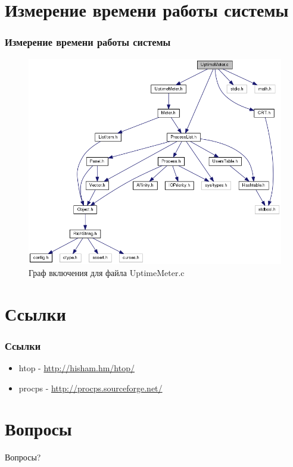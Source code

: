\documentclass{beamer}
\begin{document}
\section{Измерение времени работы системы}

\begin{frame}
\frametitle{Измерение времени работы системы}

\begin{figure}
\includegraphics[scale=0.3]{res/uptime_meter.png}
\caption{Граф включения для файла UptimeMeter.c}
\end{figure}

\end{frame}

\section{Ссылки}

\begin{frame}
\frametitle{Ссылки}

\begin{itemize}
\item htop - \url{http://hisham.hm/htop/}
\item procps - \url{http://procps.sourceforge.net/}
\end{itemize}

\end{frame}

\section{Вопросы}

\begin{frame}
\Huge{\centerline{Вопросы?}}
\end{frame}

\end{document}
